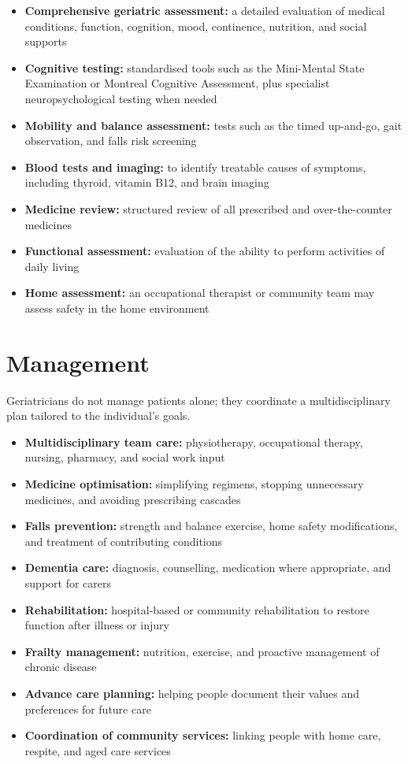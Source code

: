 \begin{itemize}
    \item \textbf{Comprehensive geriatric assessment:} a detailed evaluation of medical conditions, function, cognition, mood, continence, nutrition, and social supports
    \item \textbf{Cognitive testing:} standardised tools such as the Mini-Mental State Examination or Montreal Cognitive Assessment, plus specialist neuropsychological testing when needed
    \item \textbf{Mobility and balance assessment:} tests such as the timed up-and-go, gait observation, and falls risk screening
    \item \textbf{Blood tests and imaging:} to identify treatable causes of symptoms, including thyroid, vitamin B12, and brain imaging
    \item \textbf{Medicine review:} structured review of all prescribed and over-the-counter medicines
    \item \textbf{Functional assessment:} evaluation of the ability to perform activities of daily living
    \item \textbf{Home assessment:} an occupational therapist or community team may assess safety in the home environment
\end{itemize}

\section*{Management}
Geriatricians do not manage patients alone; they coordinate a multidisciplinary plan tailored to the individual's goals.

\begin{itemize}
    \item \textbf{Multidisciplinary team care:} physiotherapy, occupational therapy, nursing, pharmacy, and social work input
    \item \textbf{Medicine optimisation:} simplifying regimens, stopping unnecessary medicines, and avoiding prescribing cascades
    \item \textbf{Falls prevention:} strength and balance exercise, home safety modifications, and treatment of contributing conditions
    \item \textbf{Dementia care:} diagnosis, counselling, medication where appropriate, and support for carers
    \item \textbf{Rehabilitation:} hospital-based or community rehabilitation to restore function after illness or injury
    \item \textbf{Frailty management:} nutrition, exercise, and proactive management of chronic disease
    \item \textbf{Advance care planning:} helping people document their values and preferences for future care
    \item \textbf{Coordination of community services:} linking people with home care, respite, and aged care services
\end{itemize}

